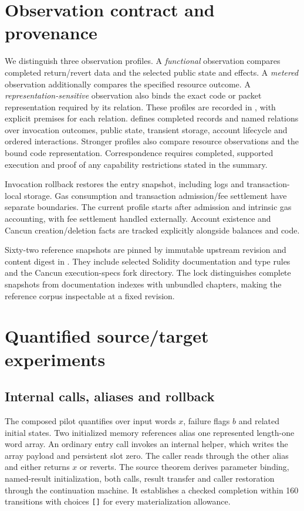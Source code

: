 \documentclass[conference]{IEEEtran}
\newcommand{\code}[1]{\texttt{#1}}
\begin{document}
\section{Observation contract and provenance}
We distinguish three observation profiles. A \emph{functional} observation
compares completed return/revert data and the selected public state and effects.
A \emph{metered} observation additionally compares the specified resource
outcome. A \emph{representation-sensitive} observation also binds the exact
code or packet representation required by its relation. These profiles are
recorded in , with explicit premises for each relation.
 defines completed records and named
relations over invocation outcomes, public state, transient storage,
account lifecycle and ordered interactions. Stronger profiles also compare
resource observations and the bound code representation. Correspondence requires
completed, supported execution and proof of any capability restrictions stated
in the summary.

Invocation rollback restores the entry snapshot, including logs and
transaction-local storage. Gas consumption and transaction admission/fee
settlement have separate boundaries. The current profile starts after
admission and intrinsic gas accounting, with fee settlement handled externally.
Account existence and Cancun creation/deletion facts are tracked explicitly
alongside balances and code.

Sixty-two reference snapshots are pinned by immutable upstream revision and
content digest in . They include selected Solidity
documentation and type rules and the Cancun execution-specs fork directory.
The lock distinguishes complete snapshots from documentation indexes with
unbundled chapters, making the reference corpus inspectable at a fixed revision.

\section{Quantified source/target experiments}
\subsection{Internal calls, aliases and rollback}
The composed pilot quantifies over input words $x$, failure flags
$b$ and related initial states. Two initialized memory references alias one
represented length-one word array. An ordinary entry call invokes an
internal helper, which writes the array payload and persistent slot zero. The
caller reads through the other alias and either returns $x$ or reverts. The
source theorem derives parameter binding, named-result initialization, both
calls, result transfer and caller restoration through the continuation machine.
It establishes a checked completion within 160 transitions with choices
\code{[]} for every materialization allowance.
\end{document}
